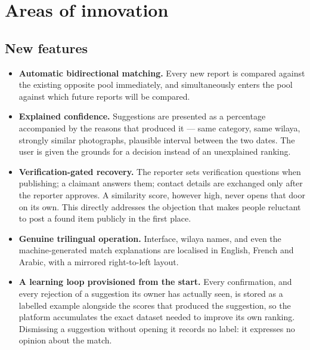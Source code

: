\section{Areas of innovation}

\subsection{New features}

\begin{itemize}[leftmargin=1.4em,itemsep=4pt]
  \item \textbf{Automatic bidirectional matching.} Every new report is compared
        against the existing opposite pool immediately, and simultaneously
        enters the pool against which future reports will be compared.

  \item \textbf{Explained confidence.} Suggestions are presented as a percentage
        accompanied by the reasons that produced it --- same category, same
        wilaya, strongly similar photographs, plausible interval between the two
        dates. The user is given the grounds for a decision instead of an
        unexplained ranking.

  \item \textbf{Verification-gated recovery.} The reporter sets verification
        questions when publishing; a claimant answers them; contact details are
        exchanged only after the reporter approves. A similarity score, however
        high, never opens that door on its own. This directly addresses the
        objection that makes people reluctant to post a found item publicly in
        the first place.

  \item \textbf{Genuine trilingual operation.} Interface, wilaya names, and even
        the machine-generated match explanations are localised in English,
        French and Arabic, with a mirrored right-to-left layout.

  \item \textbf{A learning loop provisioned from the start.} Every confirmation,
        and every rejection of a suggestion its owner has actually seen, is
        stored as a labelled example alongside the scores that produced the
        suggestion, so the platform accumulates the exact dataset needed to
        improve its own ranking. Dismissing a suggestion without opening it
        records no label: it expresses no opinion about the match.
\end{itemize}

